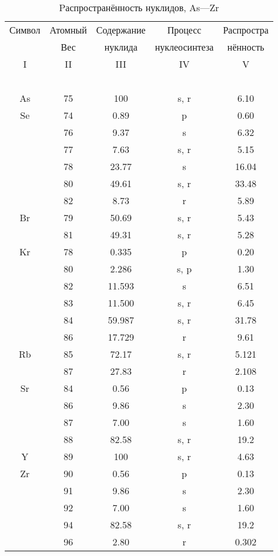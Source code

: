 \documentclass[a5paper,openany]{book}
\begin{document}
\begin{table}[h!]
	{\small
		\begin{tabular}{ccccc}
			Символ  & Атомный &  Содержание  & Процесс & Распростра   \\
			~ & Вес &  нуклида  &  нуклеосинтеза  & нённость  \\
			\hline 
			I & II &  III  & IV & V \\
			\hline 
			~ & ~ & ~ & ~ & ~  \\
			As & 75 & 100 & s, r &  6.10 \\ [1mm]
			Se & 74 & 0.89 & p & 0.60 \\ [1mm]
			& 76 & 9.37 & s & 6.32 \\ [1mm] 
			& 77 &  7.63 & s, r & 5.15 \\ [1mm]  			
			& 78 & 23.77 & s & 16.04\\ [1mm] 
			& 80 & 49.61 & s, r & 33.48 \\ [1mm]			
			& 82 & 8.73 & r & 5.89 \\ [1mm]			
			Br & 79 & 50.69 & s, r  & 5.43 \\ [1mm]
			& 81 & 49.31 & s, r  & 5.28 \\ [1mm] 
			Kr & 78 & 0.335 & p & 0.20 \\ [1mm]
			& 80 & 2.286 & s, p & 1.30 \\ [1mm] 
			& 82 &  11.593 & s & 6.51 \\ [1mm]  			
			& 83 & 11.500 & s, r & 6.45 \\ [1mm] 
			& 84 & 59.987 & s, r & 31.78 \\ [1mm]			
			& 86 & 17.729 & r & 9.61 \\ [1mm]			
			Rb & 85 & 72.17 & s, r  & 5.121 \\ [1mm]
			& 87 & 27.83 & r  & 2.108 \\ [1mm] 	
			Sr & 84 & 0.56 & p & 0.13 \\ [1mm]
			& 86 & 9.86 & s & 2.30 \\ [1mm] 
			& 87 &  7.00 & s & 1.60 \\ [1mm]  			
			& 88 & 82.58 & s, r & 19.2 \\ [1mm] 
			Y & 89 & 100 & s, r & 4.63 \\ [1mm]
			Zr & 90 & 0.56 & p & 0.13 \\ [1mm]
			& 91 & 9.86 & s & 2.30 \\ [1mm] 
			& 92 &  7.00 & s & 1.60 \\ [1mm]  			
			& 94 & 82.58 & s, r & 19.2 \\ [1mm] 
			& 96 & 2.80 & r & 0.302 \\ [1mm] 			
			\hline 
		\end{tabular}
	}
	\caption{Pаспространённость нуклидов, As---Zr}
	\label{t:AbudanceSolarAsZr}
\end{table}
\end{document}

